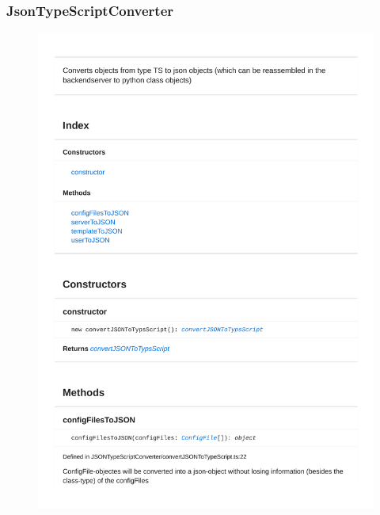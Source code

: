 \subsubsection{JsonTypeScriptConverter}
\begin{figure}[H]
\centerline{\includegraphics[width=\textwidth]{FrontendDocsAsPDF/JSONTypeSriptConverter/convertJSONToTypeScript.pdf}}
\end{figure}

